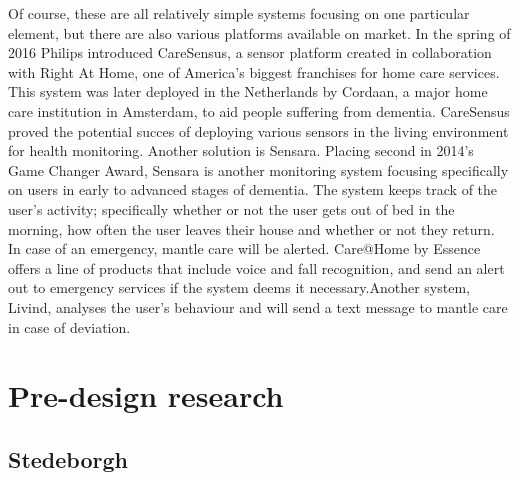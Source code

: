 \documentclass{below-ext}
\begin{document}
Of course, these are all relatively simple systems focusing on one particular element, but there are also various platforms available on market. In the spring of 2016 Philips introduced CareSensus, a sensor platform created in collaboration with Right At Home, one of America's biggest franchises for  home care services. This system was later deployed in the Netherlands by Cordaan, a major home care institution in Amsterdam, to aid people suffering from dementia. CareSensus proved the potential succes of deploying various sensors in the living environment for health monitoring. Another solution is Sensara. Placing second in 2014's Game Changer Award, Sensara is another monitoring system focusing specifically on users in early to advanced stages of dementia. The system keeps track of the user's activity; specifically whether or not the user gets out of bed in the morning, how often the user leaves their house and whether or not they return. In case of an emergency, mantle care will be alerted. Care@Home by Essence offers a line of products that include voice and fall recognition, and send an alert out to emergency services if the system deems it necessary.Another system, Livind, analyses the user's behaviour and will send a text message to mantle care in case of deviation. 

\section{Pre-design research}

\subsection{Stedeborgh}
\end{document}

